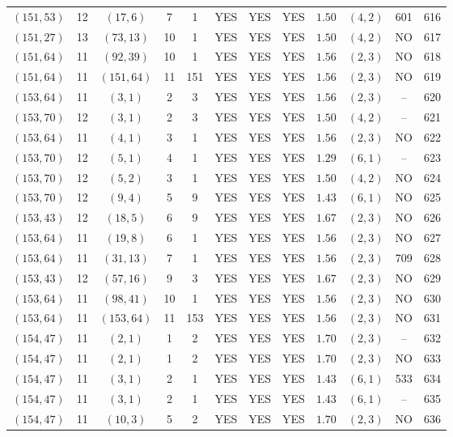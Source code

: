 \begin{longtable}{|c|c|c|c|c|c|c|c|c|c|c|c|}
$(151,53)$ & 12 & $(17,6)$ & 7 & 1 & YES & YES & YES & $1.50$ & $(4,2)$ & 601 & 616\\
$(151,27)$ & 13 & $(73,13)$ & 10 & 1 & YES & YES & YES & $1.50$ & $(4,2)$ & NO & 617\\
$(151,64)$ & 11 & $(92,39)$ & 10 & 1 & YES & YES & YES & $1.56$ & $(2,3)$ & NO & 618\\
$(151,64)$ & 11 & $(151,64)$ & 11 & 151 & YES & YES & YES & $1.56$ & $(2,3)$ & NO & 619\\
$(153,64)$ & 11 & $(3,1)$ & 2 & 3 & YES & YES & YES & $1.56$ & $(2,3)$ & -- & 620\\
$(153,70)$ & 12 & $(3,1)$ & 2 & 3 & YES & YES & YES & $1.50$ & $(4,2)$ & -- & 621\\
$(153,64)$ & 11 & $(4,1)$ & 3 & 1 & YES & YES & YES & $1.56$ & $(2,3)$ & NO & 622\\
$(153,70)$ & 12 & $(5,1)$ & 4 & 1 & YES & YES & YES & $1.29$ & $(6,1)$ & -- & 623\\
$(153,70)$ & 12 & $(5,2)$ & 3 & 1 & YES & YES & YES & $1.50$ & $(4,2)$ & NO & 624\\
$(153,70)$ & 12 & $(9,4)$ & 5 & 9 & YES & YES & YES & $1.43$ & $(6,1)$ & NO & 625\\
$(153,43)$ & 12 & $(18,5)$ & 6 & 9 & YES & YES & YES & $1.67$ & $(2,3)$ & NO & 626\\
$(153,64)$ & 11 & $(19,8)$ & 6 & 1 & YES & YES & YES & $1.56$ & $(2,3)$ & NO & 627\\
$(153,64)$ & 11 & $(31,13)$ & 7 & 1 & YES & YES & YES & $1.56$ & $(2,3)$ & 709 & 628\\
$(153,43)$ & 12 & $(57,16)$ & 9 & 3 & YES & YES & YES & $1.67$ & $(2,3)$ & NO & 629\\
$(153,64)$ & 11 & $(98,41)$ & 10 & 1 & YES & YES & YES & $1.56$ & $(2,3)$ & NO & 630\\
$(153,64)$ & 11 & $(153,64)$ & 11 & 153 & YES & YES & YES & $1.56$ & $(2,3)$ & NO & 631\\
$(154,47)$ & 11 & $(2,1)$ & 1 & 2 & YES & YES & YES & $1.70$ & $(2,3)$ & -- & 632\\
$(154,47)$ & 11 & $(2,1)$ & 1 & 2 & YES & YES & YES & $1.70$ & $(2,3)$ & NO & 633\\
$(154,47)$ & 11 & $(3,1)$ & 2 & 1 & YES & YES & YES & $1.43$ & $(6,1)$ & 533 & 634\\
$(154,47)$ & 11 & $(3,1)$ & 2 & 1 & YES & YES & YES & $1.43$ & $(6,1)$ & -- & 635\\
$(154,47)$ & 11 & $(10,3)$ & 5 & 2 & YES & YES & YES & $1.70$ & $(2,3)$ & NO & 636\\

\end{longtable}
